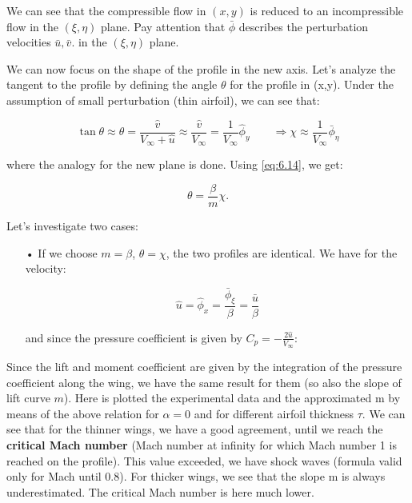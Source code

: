 	We can see that the compressible flow in $(x,y)$ is reduced to an incompressible flow in the $(\xi, \eta)$ plane. Pay attention that $\bar{\phi}$ describes the perturbation velocities $\bar{u}, \bar{v}$. in the $(\xi, \eta)$ plane.  
	
	We can now focus on the shape of the profile in the new axis. Let's analyze the tangent to the profile by defining the angle $\theta$ for the profile in (x,y). Under the assumption of small perturbation (thin airfoil), we can see that:
	
	\begin{equation}
	\tan \theta \approx \theta = \frac{\hat{v}}{V_\infty + \hat{u}} \approx \frac{\hat{v}}{V_\infty} = \frac{1}{V_\infty} \hat{\phi} _y \qquad \Rightarrow \chi \approx \frac{1}{V_\infty} \bar{\phi} _\eta
	\end{equation}
	
	where the analogy for the new plane is done. Using \eqref{eq:6.14}, we get: 
	
	\begin{equation}
	\theta = \frac{\beta}{m} \chi.
	\end{equation}
	
	Let's investigate two cases: 
	\begin{itemize}
	\item[•] If we choose $m=\beta$, $\theta = \chi$, the two profiles are identical. We have for the velocity: 
	
	\begin{equation}
	\hat{u} = \hat{\phi} _x = \frac{\bar{\phi}_\xi}{\beta} = \frac{\bar{u}}{\beta}
	\end{equation}
	
	and since the pressure coefficient is given by $C_p = -\frac{2\hat{u}}{V_\infty}$: 
		\end{itemize}		
		
	\begin{center}
	\end{center}

	
	Since the lift and moment coefficient are given by the integration of the pressure coefficient along the wing, we have the same result for them (so also the slope of lift curve $m$). Here is plotted the experimental data and the approximated m by means of the above relation for $\alpha = 0$ and for different airfoil thickness $\tau$. We can see that for the thinner wings, we have a good agreement, until we reach the \textbf{critical Mach number} (Mach number at infinity for which Mach number 1 is reached on the profile).  This value exceeded, we have shock waves (formula valid only for Mach until 0.8). 
	For thicker wings, we see that the slope m is always underestimated. The critical Mach number is here much lower. 
	
